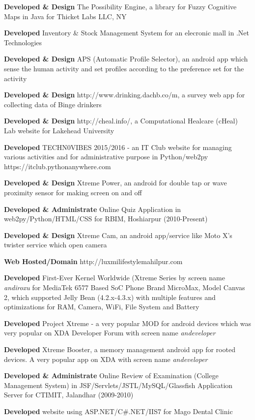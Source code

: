 \documentclass[margin,line]{res}
\begin{document}
\begin{resume}
\textbf{Developed \& Design} The Possibility Engine, a library for Fuzzy Cognitive Maps in Java for Thicket Labs LLC, NY

\textbf{Developed} Inventory \& Stock Management System for an elecronic mall in .Net Technologies

\textbf{Developed \& Design} APS (Automatic Profile Selector), an android app which sense the human activity and set profiles according to the preference set for the activity

\textbf{Developed \& Design} http://www.drinking.dachb.co/m, a survey web app for collecting data of Binge drinkers

\textbf{Developed \& Design} http://cheal.info/, a Computational Healcare (cHeal) Lab website for Lakehead University

\textbf{Developed} TECHN0VIBES 2015/2016 - an IT Club website for managing various activities and for administrative purpose in Python/web2py https://itclub.pythonanywhere.com

\textbf{Developed \& Design} Xtreme Power, an android for double tap or wave proximity sensor for making screen on and off

\textbf{Developed \& Administrate} Online Quiz Application in web2py/Python/HTML/CSS for RBIM, Hoshiarpur (2010-Present)

\textbf{Developed \& Design} Xtreme Cam, an android app/service like Moto X's twister service which open camera 

\textbf{Web Hosted/Domain} http://luxmilifestylemahilpur.com

\textbf{Developed} First-Ever Kernel Worldwide (Xtreme Series by screen name \textit{andiroxu} for MediaTek 6577 Based SoC Phone Brand MicroMax, Model Canvas 2, which supported Jelly Bean (4.2.x-4.3.x) with multiple features and optimizations for RAM, Camera, WiFi, File System and Battery 

\textbf{Developed} Project Xtreme - a very popular MOD for android devices which was very popular on XDA Developer Forum with screen name \textit{andeveloper}

\textbf{Developed} Xtreme Booster, a memory management android app for rooted devices. A very popular app on XDA with screen name \textit{andeveloper}

\textbf{Developed \& Administrate} Online Review of Examination (College Management System) in JSF/Servlets/JSTL/MySQL/Glassfish Application Server for CTIMIT, Jalandhar (2009-2010)

\textbf{Developed} website using ASP.NET/C\#.NET/IIS7 for Mago Dental Clinic


\end{resume}
\end{document}
